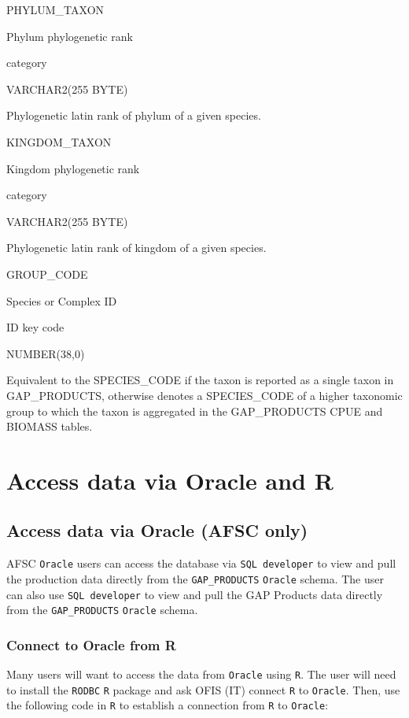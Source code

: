 \documentclass[
  letterpaper,
  oneside,
  open=any]{scrbook}
\begin{document}
PHYLUM\_TAXON

Phylum phylogenetic rank

category

VARCHAR2(255 BYTE)

Phylogenetic latin rank of phylum of a given species.

KINGDOM\_TAXON

Kingdom phylogenetic rank

category

VARCHAR2(255 BYTE)

Phylogenetic latin rank of kingdom of a given species.

GROUP\_CODE

Species or Complex ID

ID key code

NUMBER(38,0)

Equivalent to the SPECIES\_CODE if the taxon is reported as a single
taxon in GAP\_PRODUCTS, otherwise denotes a SPECIES\_CODE of a higher
taxonomic group to which the taxon is aggregated in the GAP\_PRODUCTS
CPUE and BIOMASS tables.

\chapter{Access data via Oracle and
R}\label{access-data-via-oracle-and-r}

\section*{Access data via Oracle (AFSC
only)}\label{access-data-via-oracle-afsc-only}


AFSC \texttt{Oracle} users can access the database via
\texttt{SQL\ developer} to view and pull the production data directly
from the \texttt{GAP\_PRODUCTS} \texttt{Oracle} schema. The user can
also use \texttt{SQL\ developer} to view and pull the GAP Products data
directly from the \texttt{GAP\_PRODUCTS} \texttt{Oracle} schema.

\subsection{Connect to Oracle from R}\label{connect-to-oracle-from-r}

Many users will want to access the data from \texttt{Oracle} using
\texttt{R}. The user will need to install the \texttt{RODBC} \texttt{R}
package and ask OFIS (IT) connect \texttt{R} to \texttt{Oracle}. Then,
use the following code in \texttt{R} to establish a connection from
\texttt{R} to \texttt{Oracle}:
\end{document}
